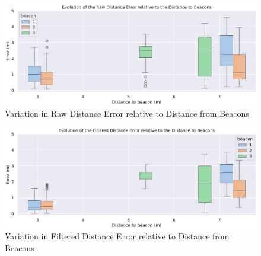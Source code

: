 \begin{figure}[h]
    \centering
    \includegraphics[width=\linewidth]{assets/beacon-dist-raw-error.pdf}
    \caption{Variation in Raw Distance Error relative to Distance from Beacons}
    \label{fig:beacon-dist-raw-error}
\end{figure}

\begin{figure}[h]
    \centering
    \includegraphics[width=\linewidth]{assets/beacon-dist-filtered-error.pdf}
    \caption{Variation in Filtered Distance Error relative to Distance from Beacons}
    \label{fig:beacon-dist-filtered-error}
\end{figure}



